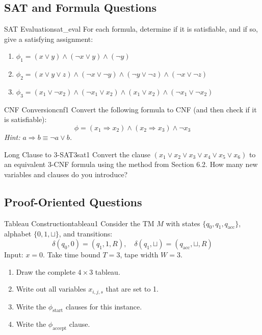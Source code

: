 \documentclass[12pt,a4paper]{article}
\begin{document}
\subsection{SAT and Formula Questions}

\begin{exercise}{SAT Evaluation}{sat_eval}
For each formula, determine if it is satisfiable, and if so, give a satisfying assignment:
\begin{enumerate}[label=(\alph*),leftmargin=2em]
  \item $\phi_1 = (x \lor y) \land (\neg x \lor y) \land (\neg y)$
  \item $\phi_2 = (x \lor y \lor z) \land (\neg x \lor \neg y) \land (\neg y \lor \neg z) \land (\neg x \lor \neg z)$
  \item $\phi_3 = (x_1 \lor \neg x_2) \land (\neg x_1 \lor x_2) \land (x_1 \lor x_2) \land (\neg x_1 \lor \neg x_2)$
\end{enumerate}
\end{exercise}

\begin{exercise}{CNF Conversion}{cnf1}
Convert the following formula to CNF (and then check if it is satisfiable):
\[
  \phi = (x_1 \Rightarrow x_2) \land (x_2 \Rightarrow x_3) \land \neg x_3
\]
\textit{Hint: $a \Rightarrow b \equiv \neg a \lor b$.}
\end{exercise}

\begin{exercise}{Long Clause to 3-SAT}{3sat1}
Convert the clause $(x_1 \lor x_2 \lor x_3 \lor x_4 \lor x_5 \lor x_6)$ to an 
equivalent 3-CNF formula using the method from Section 6.2.
How many new variables and clauses do you introduce?
\end{exercise}

\subsection{Proof-Oriented Questions}

\begin{exercise}{Tableau Construction}{tableau1}
Consider the TM $M$ with states $\{q_0, q_1, q_\text{acc}\}$, alphabet $\{0,1,\sqcup\}$,
and transitions:
\[
  \delta(q_0, 0) = (q_1, 1, R),\quad \delta(q_1, \sqcup) = (q_\text{acc}, \sqcup, R)
\]
Input: $x = 0$. Take time bound $T = 3$, tape width $W = 3$.
\begin{enumerate}[label=(\alph*),leftmargin=2em]
  \item Draw the complete $4 \times 3$ tableau.
  \item Write out all variables $x_{i,j,s}$ that are set to 1.
  \item Write the $\phi_\text{start}$ clauses for this instance.
  \item Write the $\phi_\text{accept}$ clause.
\end{enumerate}
\end{exercise}
\end{document}
